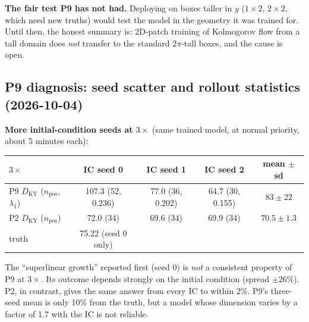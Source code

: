 \documentclass[11pt]{article}
\begin{document}
\textbf{The fair test P9 has not had.} Deploying on boxes taller in
$y$ ($1\times2$, $2\times2$, which need new truths) would test the
model in the geometry it was trained for. Until then, the honest
summary is: 2D-patch training of Kolmogorov flow from a tall domain does
\emph{not} transfer to the standard $2\pi$-tall boxes, and the cause is
open.

\subsection{P9 diagnosis: seed scatter and rollout statistics (2026-10-04)}
\label{sec:p9_diag}

\textbf{More initial-condition seeds at $3\times$} (same trained model, at
normal priority, about 5 minutes each):
\begin{center}
\small
\begin{tabular}{lcccc}
\toprule
$3\times$ & IC seed 0 & IC seed 1 & IC seed 2 & mean $\pm$ sd \\
\midrule
P9 $D_{\mathrm{KY}}$ ($n_{\mathrm{pos}}$, $\lambda_1$) & 107.3 (52, 0.236) & 77.0 (36, 0.202) & 64.7 (30, 0.155) & $83\pm22$ \\
P2 $D_{\mathrm{KY}}$ ($n_{\mathrm{pos}}$) & 72.0 (34) & 69.6 (34) & 69.9 (34) & $70.5\pm1.3$ \\
truth & 75.22 (seed 0 only) & & & \\
\bottomrule
\end{tabular}
\end{center}
The ``superlinear growth'' reported first (seed 0) is \emph{not} a
consistent property of P9 at $3\times$. Its outcome depends strongly on
the initial condition (spread $\pm26\%$). P2, in contrast, gives the
same answer from every IC to within 2\%. P9's three-seed mean is only
10\% from the truth, but a model whose dimension varies by a factor of
1.7 with the IC is not reliable.
\end{document}
